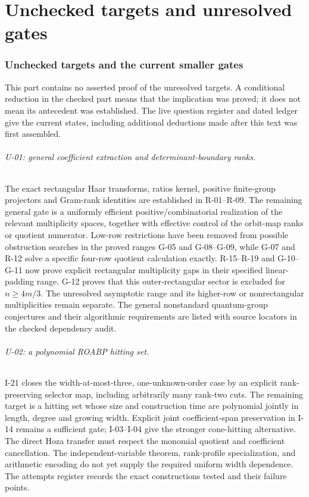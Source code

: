 \documentclass[11pt,a4paper]{article}
\theoremstyle{definition}\newtheorem{definition}{Definition}
\begin{document}
\part{Unchecked targets and unresolved gates}
\section{Unchecked targets and the current smaller gates}

This part contains no asserted proof of the unresolved targets. A conditional reduction in the checked part means that the implication was proved; it does not mean its antecedent was established. The live question register and dated ledger give the current states, including additional deductions made after this text was first assembled.

\paragraph{U-01: general coefficient extraction and determinant-boundary ranks.}
The exact rectangular Haar transforms, ratios kernel, positive finite-group projectors and Gram-rank identities are established in R-01--R-09. The remaining general gate is a uniformly efficient positive/combinatorial realization of the relevant multiplicity spaces, together with effective control of the orbit-map ranks or quotient numerator. Low-row restrictions have been removed from possible obstruction searches in the proved ranges G-05 and G-08--G-09, while G-07 and R-12 solve a specific four-row quotient calculation exactly. R-15--R-19 and G-10--G-11 now prove explicit rectangular multiplicity gaps in their specified linear-padding range. G-12 proves that this outer-rectangular sector is excluded for $n\geq4m/3$. The unresolved asymptotic range and its higher-row or nonrectangular multiplicities remain separate. The general nonstandard quantum-group conjectures and their algorithmic requirements are listed with source locators in the checked dependency audit.

\paragraph{U-02: a polynomial ROABP hitting set.}
I-21 closes the width-at-most-three, one-unknown-order case by an explicit rank-preserving selector map, including arbitrarily many rank-two cuts. The remaining target is a hitting set whose size and construction time are polynomial jointly in length, degree and growing width. Explicit joint coefficient-span preservation in I-14 remains a sufficient gate; I-03--I-04 give the stronger cone-hitting alternative. The direct Hoza transfer must respect the monomial quotient and coefficient cancellation. The independent-variable theorem, rank-profile specialization, and arithmetic encoding do not yet supply the required uniform width dependence. The attempts register records the exact constructions tested and their failure points.
\end{document}

